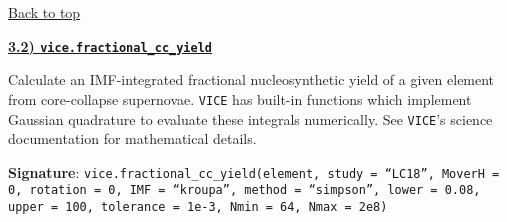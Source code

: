 \documentclass{report}
\begin{document}
\vfill
\hyperlink{top}{Back to top}
\clearpage 

\newpage
\noindent 
\begin{center}
\hypertarget{func:fractional_cc_yield}{
	\underline{\LARGE 
		\textbf{3.2) \texttt{vice.fractional\_cc\_yield}}
	}
} 
\end{center}
\par\noindent 
Calculate an IMF-integrated fractional nucleosynthetic yield of a given element 
from core-collapse supernovae. \texttt{VICE} has built-in functions which 
implement Gaussian quadrature to evaluate these integrals numerically. See 
\texttt{VICE}'s science documentation for mathematical details. 

\par\null\par\noindent 
\textbf{Signature}: \texttt{vice.fractional\_cc\_yield(element, study = 
``LC18'', MoverH = 0, rotation = 0, IMF = ``kroupa'', method = ``simpson'', 
lower = 0.08, upper = 100, tolerance = 1e-3, Nmin = 64, Nmax = 2e8)} 
\end{document}

